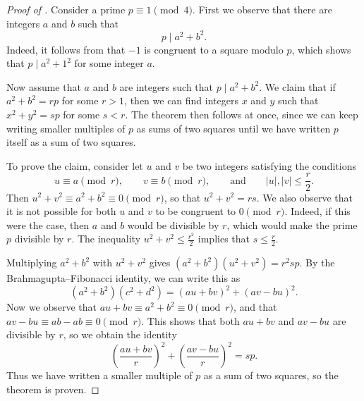 \begin{proof}[Proof of ]
  Consider a prime $p\equiv 1\pmod{4}$. First we observe that there are integers $a$ and $b$ such that
  \begin{equation*}
    p\mid a^2+b^2.
  \end{equation*}
  Indeed, it follows from  that $-1$ is congruent to a square modulo $p$, which shows that $p\mid a^2+1^2$ for some integer $a$.

  Now assume that $a$ and $b$ are integers such that $p\mid a^2+b^2$. We claim that if $a^2+b^2=rp$ for some $r>1$, then we can find integers $x$ and $y$ such that $x^2+y^2=sp$ for some $s<r$. The theorem then follows at once, since we can keep writing smaller multiples of $p$ as sums of two squares until we have written $p$ itself as a sum of two squares.

  To prove the claim, consider let $u$ and $v$ be two integers satisfying the conditions
  \begin{equation*}
    u\equiv a\pmod{r},\qquad v\equiv b\pmod{r},\qquad\text{and}\qquad |u|, |v|\leq \frac{r}{2}.
  \end{equation*}
  Then $u^2+v^2\equiv a^2+b^2\equiv 0\pmod{r}$, so that $u^2+v^2=rs$. We also observe that it is not possible for both $u$ and $v$ to be congruent to $0\pmod{r}$. Indeed, if this were the case, then $a$ and $b$ would be divisible by $r$, which would make the prime $p$ divisible by $r$. The inequality $u^2+v^2\leq \frac{r^2}{2}$ implies that $s\leq \frac{r}{2}$.

  Multiplying $a^2+b^2$ with $u^2+v^2$ gives $(a^2+b^2)(u^2+v^2)=r^2sp$. By the Brahmagupta--Fibonacci identity, we can write this as
  \begin{equation*}
    (a^2+b^2)(c^2+d^2) = (au+ bv)^2 + (av - bu)^2.
  \end{equation*}
  Now we observe that $au+bv\equiv a^2+b^2\equiv 0\pmod{r}$, and that $av-bu\equiv ab-ab\equiv 0\pmod{r}$. This shows that both $au+bv$ and $av-bu$ are divisible by $r$, so we obtain the identity
  \begin{equation*}
    \left(\frac{au+ bv}{r}\right)^2 + \left(\frac{av- bu}{r}\right)^2=sp.
  \end{equation*}
  Thus we have written a smaller multiple of $p$ as a sum of two squares, so the theorem is proven.
\end{proof}

